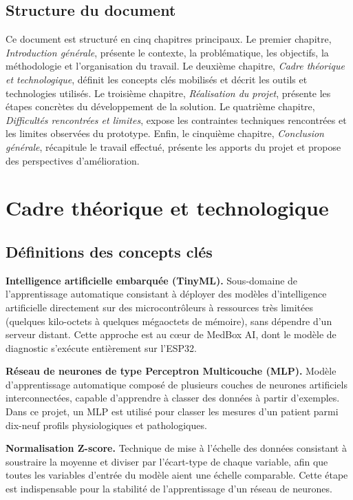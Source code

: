 \documentclass[12pt,a4paper]{report}
\begin{document}
\section{Structure du document}
Ce document est structuré en cinq chapitres principaux. Le premier chapitre, \textit{Introduction générale}, présente le contexte, la problématique, les objectifs, la méthodologie et l'organisation du travail. Le deuxième chapitre, \textit{Cadre théorique et technologique}, définit les concepts clés mobilisés et décrit les outils et technologies utilisés. Le troisième chapitre, \textit{Réalisation du projet}, présente les étapes concrètes du développement de la solution. Le quatrième chapitre, \textit{Difficultés rencontrées et limites}, expose les contraintes techniques rencontrées et les limites observées du prototype. Enfin, le cinquième chapitre, \textit{Conclusion générale}, récapitule le travail effectué, présente les apports du projet et propose des perspectives d'amélioration.

\chapter{Cadre théorique et technologique}

\section{Définitions des concepts clés}

\textbf{Intelligence artificielle embarquée (TinyML).} Sous-domaine de l'apprentissage automatique consistant à déployer des modèles d'intelligence artificielle directement sur des microcontrôleurs à ressources très limitées (quelques kilo-octets à quelques mégaoctets de mémoire), sans dépendre d'un serveur distant. Cette approche est au cœur de MedBox AI, dont le modèle de diagnostic s'exécute entièrement sur l'ESP32.

\textbf{Réseau de neurones de type Perceptron Multicouche (MLP).} Modèle d'apprentissage automatique composé de plusieurs couches de neurones artificiels interconnectées, capable d'apprendre à classer des données à partir d'exemples. Dans ce projet, un MLP est utilisé pour classer les mesures d'un patient parmi dix-neuf profils physiologiques et pathologiques.

\textbf{Normalisation Z-score.} Technique de mise à l'échelle des données consistant à soustraire la moyenne et diviser par l'écart-type de chaque variable, afin que toutes les variables d'entrée du modèle aient une échelle comparable. Cette étape est indispensable pour la stabilité de l'apprentissage d'un réseau de neurones.
\end{document}
